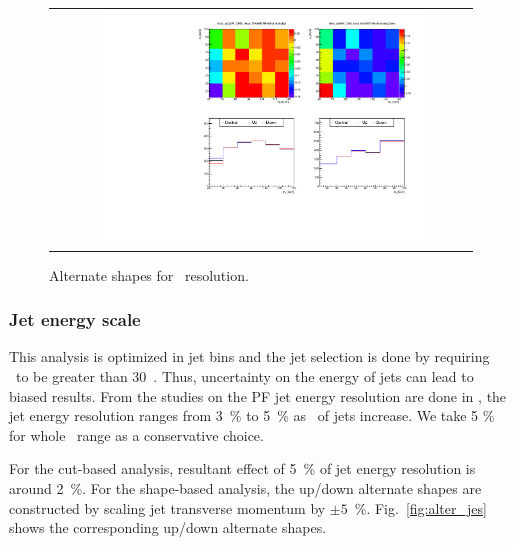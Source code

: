 %
\begin{figure}[htp]
\centering
\begin{tabular}{c}
\includegraphics[width=0.8\textwidth]{figures/histo_qqWW_CMS_hww_MVAMETResBounding_0j_zoom.pdf}
\end{tabular}
\caption{Alternate shapes for \met\ resolution.}
\label{fig:alter_metres}
\end{figure}

\subsubsection{Jet energy scale} 

This analysis is optimized in jet bins and the jet selection is done by 
requiring \pt\ to be greater than 30~\GeV. Thus, uncertainty on the 
energy of jets can lead to biased results. From the studies on the PF jet 
energy resolution are done in \cite{Chatrchyan:2011ds}, the jet energy 
resolution ranges from 3~\% to 5~\% as \Eta\ of jets increase. We take 
5 \% for whole \Eta\ range as a conservative choice.   

For the cut-based analysis, resultant effect of 5~\% of jet energy resolution 
is around 2~\%. 
For the shape-based analysis, the up/down alternate shapes are constructed
by scaling jet transverse momentum by $\pm 5$~\%.
Fig.~\ref{fig:alter_jes} shows the corresponding up/down alternate shapes. 



